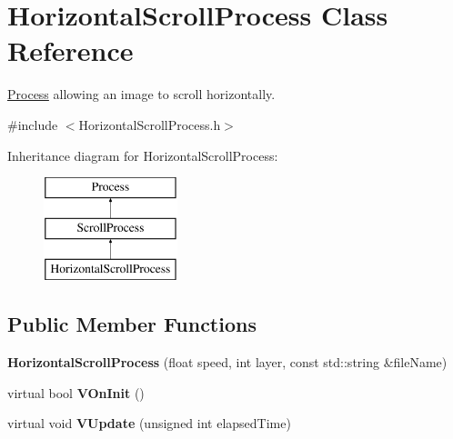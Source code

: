 \hypertarget{classHorizontalScrollProcess}{\section{Horizontal\-Scroll\-Process Class Reference}
\label{classHorizontalScrollProcess}
}


\hyperlink{classProcess}{Process} allowing an image to scroll horizontally.  




{\ttfamily \#include $<$Horizontal\-Scroll\-Process.\-h$>$}

Inheritance diagram for Horizontal\-Scroll\-Process\-:\begin{figure}[H]
\begin{center}
\leavevmode
\includegraphics[height=3.000000cm]{classHorizontalScrollProcess}
\end{center}
\end{figure}
\subsection*{Public Member Functions}
\begin{DoxyCompactItemize}
\item 
\hypertarget{classHorizontalScrollProcess_a4c5d4e3a302810181d5c823f0faa42f3}{{\bfseries Horizontal\-Scroll\-Process} (float speed, int layer, const std\-::string \&file\-Name)}\label{classHorizontalScrollProcess_a4c5d4e3a302810181d5c823f0faa42f3}

\item 
\hypertarget{classHorizontalScrollProcess_ac48fe38195a84e41d79ca2d6445d032c}{virtual bool {\bfseries V\-On\-Init} ()}\label{classHorizontalScrollProcess_ac48fe38195a84e41d79ca2d6445d032c}

\item 
\hypertarget{classHorizontalScrollProcess_a93125b266032579ef3a655bee2e2db84}{virtual void {\bfseries V\-Update} (unsigned int elapsed\-Time)}\label{classHorizontalScrollProcess_a93125b266032579ef3a655bee2e2db84}

\end{DoxyCompactItemize}
